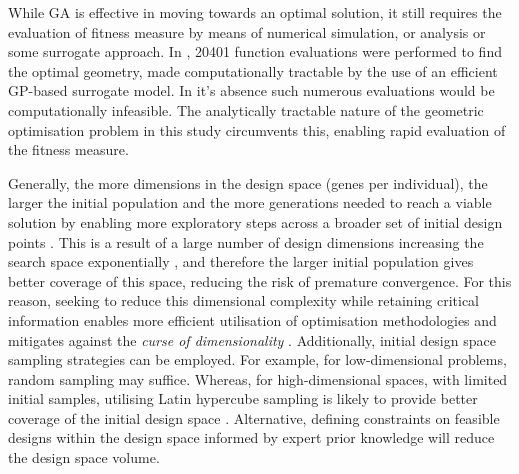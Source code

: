 \documentclass{article}
\begin{document}
While GA is effective in moving towards an optimal solution, it still requires the evaluation of fitness measure by means of numerical simulation, or analysis or some surrogate approach. In \cite{Taj2023}, 20401 function evaluations were performed to find the optimal geometry, made computationally  tractable by the use of an efficient GP-based surrogate model. In it's absence  such numerous evaluations would be computationally infeasible. The analytically tractable nature of the geometric optimisation problem in this study circumvents this, enabling rapid evaluation of the fitness measure. 

Generally, the more dimensions in the design space (genes per individual), the larger the initial population and the more generations needed to reach a viable solution by enabling more exploratory steps across a broader set of initial design points \citep{Gibbs2011}. This is a result of a large number of design dimensions increasing the search space exponentially \citep{Keogh2017}, and therefore the larger initial population gives better coverage of this space, reducing the risk of premature convergence. For this reason, seeking to reduce this dimensional complexity while retaining critical information enables more efficient utilisation of optimisation methodologies and mitigates against the \textit{curse of dimensionality} \citep{Serani2024}. Additionally, initial design space sampling strategies can be employed. For example, for low-dimensional problems, random sampling may suffice. Whereas, for high-dimensional spaces, with limited initial samples, utilising Latin hypercube sampling is likely to provide better coverage of the initial design space \citep{Kucherenko2015}. Alternative, defining constraints on feasible designs within the design space informed by expert prior knowledge will reduce the design space volume. 
\end{document}
